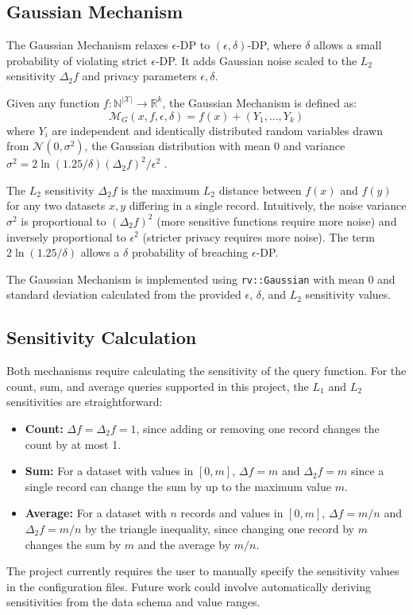 \subsection{Gaussian Mechanism}
The Gaussian Mechanism relaxes $\epsilon$-DP to $(\epsilon,\delta)$-DP, where $\delta$ allows a small probability of violating strict $\epsilon$-DP. It adds Gaussian noise scaled to the $L_2$ sensitivity $\Delta_2 f$ and privacy parameters $\epsilon, \delta$.

\begin{definition}
Given any function $f: \mathbb{N}^{|\mathcal{X}|} \rightarrow \mathbb{R}^k$, the Gaussian Mechanism is defined as: 
\begin{equation}
\mathcal{M}_G(x, f, \epsilon, \delta) = f(x) + (Y_1, \ldots, Y_k)
\end{equation}
where $Y_i$ are independent and identically distributed random variables drawn from $\mathcal{N}(0, \sigma^2)$, the Gaussian distribution with mean 0 and variance $\sigma^2 = 2\ln(1.25/\delta)(\Delta_2 f)^2 / \epsilon^2$ \citep[Thm. 3.22]{Dwork2014}.
\end{definition}

The $L_2$ sensitivity $\Delta_2 f$ is the maximum $L_2$ distance between $f(x)$ and $f(y)$ for any two datasets $x, y$ differing in a single record. Intuitively, the noise variance $\sigma^2$ is proportional to $(\Delta_2 f)^2$ (more sensitive functions require more noise) and inversely proportional to $\epsilon^2$ (stricter privacy requires more noise). The term $2\ln(1.25/\delta)$ allows a $\delta$ probability of breaching $\epsilon$-DP.

The Gaussian Mechanism is implemented using \texttt{rv::Gaussian} with mean 0 and standard deviation calculated from the provided $\epsilon$, $\delta$, and $L_2$ sensitivity values.

\subsection{Sensitivity Calculation}
Both mechanisms require calculating the sensitivity of the query function. For the count, sum, and average queries supported in this project, the $L_1$ and $L_2$ sensitivities are straightforward:
\begin{itemize}
    \item \textbf{Count:} $\Delta f = \Delta_2 f = 1$, since adding or removing one record changes the count by at most 1.
    \item \textbf{Sum:} For a dataset with values in $[0, m]$, $\Delta f = m$ and $\Delta_2 f = m$ since a single record can change the sum by up to the maximum value $m$.
    \item \textbf{Average:} For a dataset with $n$ records and values in $[0,m]$, $\Delta f = m/n$ and $\Delta_2 f = m/n$ by the triangle inequality, since changing one record by $m$ changes the sum by $m$ and the average by $m/n$.
\end{itemize}
The project currently requires the user to manually specify the sensitivity values in the configuration files. Future work could involve automatically deriving sensitivities from the data schema and value ranges.

